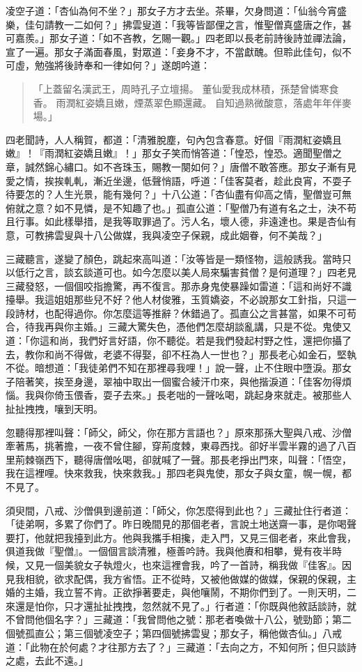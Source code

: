 凌空子道：「杏仙為何不坐？」那女子方才去坐。茶畢，欠身問道：「仙翁今宵盛樂，佳句請教一二如何？」拂雲叟道：「我等皆鄙俚之言，惟聖僧真盛唐之作，甚可嘉羨。」那女子道：「如不吝教，乞賜一觀。」四老即以長老前詩後詩並禪法論，宣了一遍。那女子滿面春風，對眾道：「妾身不才，不當獻醜。但聆此佳句，似不可虛，勉強將後詩奉和一律如何？」遂朗吟道：
\begin{quote}
「上蓋留名漢武王，周時孔子立壇揚。
董仙愛我成林積，孫楚曾憐寒食香。
雨潤紅姿嬌且嫩，煙蒸翠色顯還藏。
自知過熟微酸意，落處年年伴麥場。」
\end{quote}

四老聞詩，人人稱賀，都道：「清雅脫塵，句內包含春意。好個『雨潤紅姿嬌且嫩』！『雨潤紅姿嬌且嫩』！」那女子笑而悄答道：「惶恐，惶恐。適聞聖僧之章，誠然錦心繡口。如不吝珠玉，賜教一闋如何？」唐僧不敢答應。那女子漸有見愛之情，挨挨軋軋，漸近坐邊，低聲悄語，呼道：「佳客莫者，趁此良宵，不耍子待要怎的？人生光景，能有幾何？」十八公道：「杏仙盡有仰高之情，聖僧豈可無俯就之意？如不見憐，是不知趣了也。」孤直公道：「聖僧乃有道有名之士，決不苟且行事。如此樣舉措，是我等取罪過了。污人名，壞人德，非遠達也。果是杏仙有意，可教拂雲叟與十八公做媒，我與凌空子保親，成此姻眷，何不美哉？」

三藏聽言，遂變了顏色，跳起來高叫道：「汝等皆是一類怪物，這般誘我。當時只以低行之言，談玄談道可也。如今怎麼以美人局來騙害貧僧？是何道理？」四老見三藏發怒，一個個咬指擔驚，再不復言。那赤身鬼使暴躁如雷道：「這和尚好不識擡舉。我這姐姐那些兒不好？他人材俊雅，玉質嬌姿，不必說那女工針指，只這一段詩材，也配得過你。你怎麼這等推辭？休錯過了。孤直公之言甚當，如果不可苟合，待我再與你主婚。」三藏大驚失色，憑他們怎麼胡談亂講，只是不從。鬼使又道：「你這和尚，我們好言好語，你不聽從。若是我們發起村野之性，還把你攝了去，教你和尚不得做，老婆不得娶，卻不枉為人一世也？」那長老心如金石，堅執不從。暗想道：「我徒弟們不知在那裡尋我哩！」說一聲，止不住眼中墮淚。那女子陪著笑，挨至身邊，翠袖中取出一個蜜合綾汗巾來，與他揩淚道：「佳客勿得煩惱。我與你倚玉偎香，耍子去來。」長老咄的一聲吆喝，跳起身來就走。被那些人扯扯拽拽，嚷到天明。

忽聽得那裡叫聲：「師父，師父，你在那方言語也？」原來那孫大聖與八戒、沙僧牽著馬，挑著擔，一夜不曾住腳，穿荊度棘，東尋西找。卻好半雲半霧的過了八百里荊棘嶺西下，聽得唐僧吆喝，卻就喊了一聲。那長老掙出門來，叫聲：「悟空，我在這裡哩。快來救我，快來救我。」那四老與鬼使，那女子與女童，幌一幌，都不見了。

須臾間，八戒、沙僧俱到邊前道：「師父，你怎麼得到此也？」三藏扯住行者道：「徒弟啊，多累了你們了。昨日晚間見的那個老者，言說土地送齋一事，是你喝聲要打，他就把我擡到此方。他與我攜手相攙，走入門，又見三個老者，來此會我，俱道我做『聖僧』。一個個言談清雅，極善吟詩。我與他賡和相攀，覺有夜半時候，又見一個美貌女子執燈火，也來這裡會我，吟了一首詩，稱我做『佳客』。因見我相貌，欲求配偶，我方省悟。正不從時，又被他做媒的做媒，保親的保親，主婚的主婚，我立誓不肯。正欲掙著要走，與他嚷鬧，不期你們到了。一則天明，二來還是怕你，只才還扯扯拽拽，忽然就不見了。」行者道：「你既與他敘話談詩，就不曾問他個名字？」三藏道：「我曾問他之號：那老者喚做十八公，號勁節；第二個號孤直公；第三個號凌空子；第四個號拂雲叟；那女子，稱他做杏仙。」八戒道：「此物在於何處？才往那方去了？」三藏道：「去向之方，不知何所；但只談詩之處，去此不遠。」

